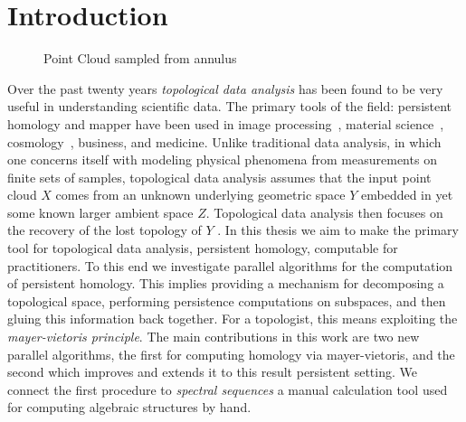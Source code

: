 \chapter{Introduction}
\begin{figure}
\centering
{}      
 \hspace{.5cm}
 \caption{Point Cloud sampled from annulus}
 \end{figure}
Over the past twenty years \emph{topological data analysis} has been found to be very useful in understanding scientific data. The primary tools of the field: persistent homology and mapper have been used in image processing~\cite{cid-lbs-08}, material science~\cite{SW-measuring-shape}, cosmology~\cite{cosmic-web}, business, and medicine. Unlike traditional data analysis, in which one concerns itself with modeling physical phenomena from measurements on finite sets of samples, topological data analysis assumes that the input point cloud $X$ comes from an unknown underlying geometric space $Y$ embedded in yet some known larger ambient space $Z$. Topological data analysis then focuses on the recovery of the lost topology of $Y$ \cite{c-tnd-09}. In this thesis we aim to make the primary tool for topological data analysis, persistent homology, computable for practitioners. To this end we investigate parallel algorithms for the computation of persistent homology. This implies providing a mechanism for decomposing a topological space, performing persistence computations on subspaces, and then gluing this information back together. For a topologist, this means exploiting the \emph{mayer-vietoris principle}. The main contributions in this work are two new parallel algorithms, the first for computing homology via mayer-vietoris, and the second which improves and extends it to this result persistent setting. We connect the first procedure to \emph{spectral sequences} a manual calculation tool used for computing algebraic structures by hand. 

